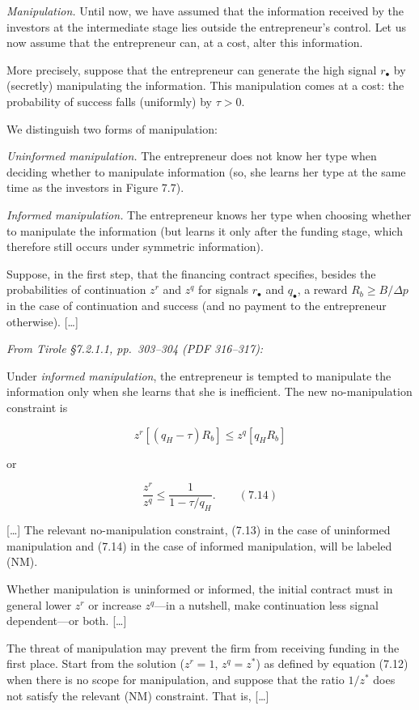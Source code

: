 \documentclass[11pt,a4paper]{article}
\begin{document}
\emph{Manipulation.} Until now, we have assumed that the information received by the investors at
the intermediate stage lies outside the entrepreneur's control. Let us now assume that the
entrepreneur can, at a cost, alter this information.

More precisely, suppose that the entrepreneur can generate the high signal \(r_\bullet\) by
(secretly) manipulating the information. This manipulation comes at a cost: the probability of
success falls (uniformly) by \(\tau > 0\).

We distinguish two forms of manipulation:

\emph{Uninformed manipulation.} The entrepreneur does not know her type when deciding whether to
manipulate information (so, she learns her type at the same time as the investors in Figure 7.7).

\emph{Informed manipulation.} The entrepreneur knows her type when choosing whether to manipulate
the information (but learns it only after the funding stage, which therefore still occurs under
symmetric information).

Suppose, in the first step, that the financing contract specifies, besides the probabilities of
continuation \(z^r\) and \(z^q\) for signals \(r_\bullet\) and \(q_\bullet\), a reward
\(R_b \geqslant B/\Delta p\) in the case of continuation and success (and no payment to the
entrepreneur otherwise). {[}\ldots{]}

\emph{From Tirole §7.2.1.1, pp.~303--304 (PDF 316--317):}

Under \emph{informed manipulation}, the entrepreneur is tempted to manipulate the information only
when she learns that she is inefficient. The new no-manipulation constraint is

\[z^r[(q_H - \tau)R_b] \leqslant z^q[q_H R_b]\]

or

\[\frac{z^r}{z^q} \leqslant \frac{1}{1 - \tau/q_H}. \qquad (7.14)\]

{[}\ldots{]} The relevant no-manipulation constraint, (7.13) in the case of uninformed manipulation
and (7.14) in the case of informed manipulation, will be labeled (NM).

Whether manipulation is uninformed or informed, the initial contract must in general lower \(z^r\)
or increase \(z^q\)---in a nutshell, make continuation less signal dependent---or both. {[}\ldots{]}

The threat of manipulation may prevent the firm from receiving funding in the first place. Start
from the solution (\(z^r = 1\), \(z^q = z^*\)) as defined by equation (7.12) when there is no scope
for manipulation, and suppose that the ratio \(1/z^*\) does not satisfy the relevant (NM)
constraint. That is, {[}\ldots{]}
\end{document}
